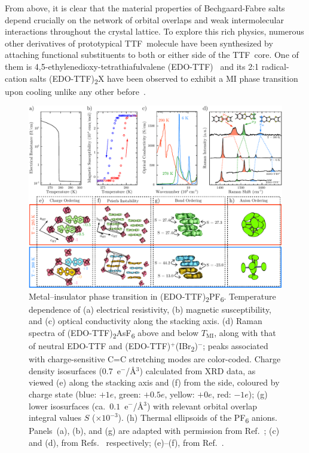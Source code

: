 From above, it is clear that the material properties of Bechgaard-Fabre salts depend crucially on
the network of orbital overlaps and weak intermolecular interactions throughout the crystal lattice.
%
To explore this rich physics, numerous other derivatives of prototypical TTF~molecule have been synthesized
by attaching functional substituents to both or either side of the TTF~core.
%
One of them is 4,5-ethylenedioxy-tetrathiafulvalene (EDO-TTF)~\cite{Papavassiliou1990, Mori1990, Meziere2000}
and its 2:1 radical-cation salts (EDO-TTF)\textsubscript{2}X
have been observed to exhibit a MI phase transition upon cooling
unlike any other before~\cite{Ota2002, Ota2003, Ota2006}.

\begin{figure}[ht!]
  \centering
  \includegraphics[width = \textwidth]{Figures/fig_EDO_static.pdf}
  \caption[Metal--insulator phase transition in (EDO-TTF)\textsubscript{2}PF\textsubscript{6}.]{
  Metal--insulator phase transition in (EDO-TTF)\textsubscript{2}PF\textsubscript{6}.
  Temperature dependence of (a) electrical resistivity, (b) magnetic susceptibility,
  and (c) optical conductivity along the stacking axis.
  (d) Raman spectra of (EDO-TTF)\textsubscript{2}AsF\textsubscript{6}
  above and below $T_\text{MI}$, along with that of neutral EDO-TTF and
  (EDO-TTF)$^+$(IBr\textsubscript{2})$^-$;
  peaks associated with charge-sensitive C=C stretching modes are color-coded.
  Charge density isosurfaces (0.7~e$^-$/\AA$^3$) calculated from XRD data,
  as viewed (e) along the stacking axis and (f) from the side,
  coloured by charge state (blue: $+1e$, green: $+0.5e$, yellow: $+0e$, red: $-1e$);
  (g) lower isosurfaces (ca.~$0.1$~e$^-$/\AA$^3$)
  with relevant orbital overlap integral values $S$ ($\times 10^{-3}$).
  (h) Thermal ellipsoids of the PF\textsubscript{6} anions.
  Panels~(a), (b), and (g) are adapted with permission from Ref.~\cite{Ota2002};
  (c) and (d), from Refs.~\cite{Drozdova2003, Drozdova2004} respectively;
  (e)--(f), from Ref.~\cite{Aoyagi2004}.
  }
  \label{fig: EDO-static}
\end{figure}
